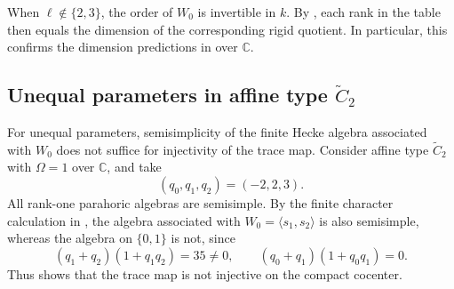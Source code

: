 \documentclass[11pt,letterpaper]{amsart}
\theoremstyle{definition}
\numberwithin{equation}{section}
\numberwithin{theorem}{section}
\newcommand{\kk}{k}
\newcommand{\CC}{\mathbb C}
\begin{document}
When $\ell\notin\{2,3\}$, the order of $W_0$ is invertible
in $\kk$. By , each rank
in the table then equals the dimension of the corresponding
rigid quotient. In particular, this confirms the dimension
predictions in \cite[Examples~3.14--3.15]{He16} over $\CC$.

\subsection{Unequal parameters in affine type
\texorpdfstring{$\widetilde C_2$}{C2}}
\label{subsec:affine-c2}

For unequal parameters, semisimplicity of the finite
Hecke algebra associated with $W_0$ does not suffice
for injectivity of the trace map.
Consider affine type $\widetilde C_2$ with $\Omega=1$
over $\CC$, and take
\[
 (q_0,q_1,q_2)=(-2,2,3).
\]
All rank-one parahoric algebras are semisimple.
By the finite character calculation in
\cite[Example~7.9]{CH}, the algebra associated with
$W_0=\langle s_1,s_2\rangle$ is also semisimple,
whereas the algebra on $\{0,1\}$ is not, since
\[
 (q_1+q_2)(1+q_1q_2)=35\ne0,
 \qquad
 (q_0+q_1)(1+q_0q_1)=0.
\]
Thus  shows that
the trace map is not injective on the compact
cocenter.
\end{document}

